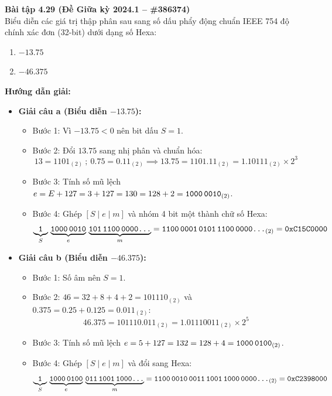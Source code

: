 \textbf{Bài tập 4.29 (Đề Giữa kỳ 2024.1 -- \#386374)}\\
Biểu diễn các giá trị thập phân sau sang số dấu phẩy động chuẩn IEEE 754 độ chính xác đơn (32-bit) dưới dạng số Hexa:
\begin{enumerate}[label=\alph*)]
    \item $-13.75$
    \item $-46.375$
\end{enumerate}
\textbf{Hướng dẫn giải:}
\begin{itemize}
    \item \textbf{Giải câu a (Biểu diễn $-13.75$):}
    \begin{itemize}
        \item Bước 1: Vì $-13.75 < 0$ nên bit dấu $S = 1$.
        \item Bước 2: Đổi $13.75$ sang nhị phân và chuẩn hóa:
        $$13 = 1101_{(2)} \ ; \ 0.75 = 0.11_{(2)} \implies 13.75 = 1101.11_{(2)} = 1.10111_{(2)} \times 2^3$$
        \item Bước 3: Tính số mũ lệch $e = E + 127 = 3 + 127 = 130 = 128 + 2 = \texttt{1000\,0010}_{(2)}$.
        \item Bước 4: Ghép $[S \mid e \mid m]$ và nhóm 4 bit một thành chữ số Hexa:
        $$\underbrace{\texttt{1}}_{S}\,\underbrace{\texttt{1000\,0010}}_{e}\,\underbrace{\texttt{101\,1100\,0000\dots}}_{m} = \texttt{1100\,0001\,0101\,1100\,0000\dots}_{(2)} = \mathbf{\texttt{0xC15C0000}}$$
    \end{itemize}
    \item \textbf{Giải câu b (Biểu diễn $-46.375$):}
    \begin{itemize}
        \item Bước 1: Số âm nên $S = 1$.
        \item Bước 2: $46 = 32 + 8 + 4 + 2 = 101110_{(2)}$ và $0.375 = 0.25 + 0.125 = 0.011_{(2)}$:
        $$46.375 = 101110.011_{(2)} = 1.01110011_{(2)} \times 2^5$$
        \item Bước 3: Tính số mũ lệch $e = 5 + 127 = 132 = 128 + 4 = \texttt{1000\,0100}_{(2)}$.
        \item Bước 4: Ghép $[S \mid e \mid m]$ và đổi sang Hexa:
        $$\underbrace{\texttt{1}}_{S}\,\underbrace{\texttt{1000\,0100}}_{e}\,\underbrace{\texttt{011\,1001\,1000\dots}}_{m} = \texttt{1100\,0010\,0011\,1001\,1000\,0000\dots}_{(2)} = \mathbf{\texttt{0xC2398000}}$$
    \end{itemize}
\end{itemize}

